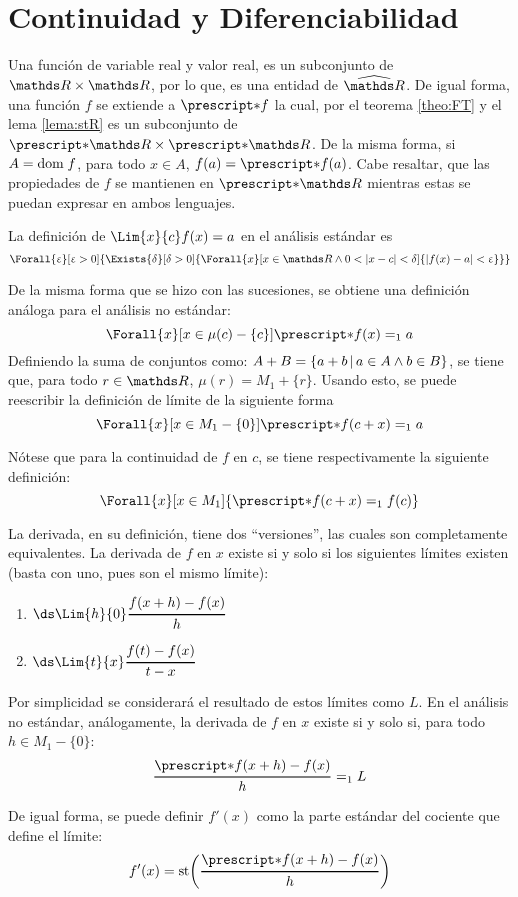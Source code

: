 \section{Continuidad y Diferenciabilidad}

Una función de variable real y valor real, es un subconjunto de
$\R\times\R$, por lo que, es una entidad de $\Rh$. De igual forma, una
función $f$ se extiende a $\st{f}$ la cual, por el teorema \ref{theo:FT}
y el lema \ref{lema:stR} es un subconjunto de $\st{\R}\times\st{\R}$.
De la misma forma, si $A=\text{dom}\; f$, para todo $x\in A$, $f(a) = \st{f(a)}$.
Cabe resaltar, que las propiedades de $f$ se mantienen en $\st{\R}$
mientras estas se puedan expresar en ambos lenguajes.

La definición de $\Lim{x}{c} f(x) = a$ en el análisis estándar es
\[
  \Forall{\e}[\e>0]{
    \Exists{\delta}[\delta>0]{
      \Forall{x}[x\in\R\land 0< |x-c|<\delta]{|f(x)-a|<\e}
    }
  }  
\]

De la misma forma que se hizo con las sucesiones, se obtiene una
definición análoga para el análisis no estándar:
\[\Forall{x}[x\in\mu(c)-\{c\}]{\st{f(x)} =_1 a}\]
Definiendo la suma de conjuntos como:
$A+B = \left\{a+b\,\middle|\,a\in A \land b\in B\right\}$, se tiene que, para todo
$r\in\R$, $\mu(r) = M_1 + \{r\}$. Usando esto, se puede
reescribir la definición de límite de la siguiente forma
\[\Forall{x}[x\in M_1-\{0\}]{\st{f(c+x)}=_1 a}\]

Nótese que para la continuidad de $f$ en $c$, se tiene respectivamente
la siguiente definición:
\[\Forall{x}[x\in M_1]{\st{f(c+x)}=_1 f(c)}\]

La derivada, en su definición, tiene dos ``versiones'', las cuales son
completamente equivalentes. La derivada de $f$ en $x$ existe si y solo
si los siguientes límites existen (basta con uno, pues son el mismo límite):

\begin{enumerate}
  \item $\ds\Lim{h}{0}\frac{f(x + h) - f(x)}{h}$
  \item $\ds\Lim{t}{x}\frac{f(t) - f(x)}{t - x}$
\end{enumerate}

Por simplicidad se considerará el resultado de estos límites como $L$.
En el análisis no estándar, análogamente, la derivada de $f$ en $x$
existe si y solo si, para todo $h\in M_1-\{0\}$:
\[\frac{\st{f(x + h)} - f(x)}{h} =_1 L\]

De igual forma, se puede definir $f'(x)$ como la parte estándar del
cociente que define el límite:
\[f'(x) = \sd{\frac{\st{f(x + h)} - f(x)}{h}}\]

